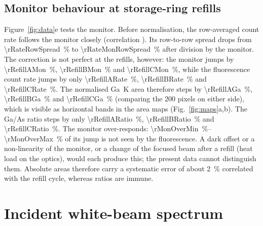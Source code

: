 \documentclass[11pt,a4paper]{article}
\begin{document}
\subsection{Monitor behaviour at storage-ring refills}\label{sec:refills}
Figure~\ref{fig:data}e tests the monitor. Before normalisation, the row-averaged count rate follows the
monitor closely (correlation \rRateMonCorr). Its row-to-row spread drops from \qty{\rRateRowSpread}{\percent}
to \qty{\rRateMonRowSpread}{\percent} after division by the monitor. The correction is not perfect at
the refills, however: the monitor jumps by \qty{\rRefillAMon}{\percent}, \qty{\rRefillBMon}{\percent} and
\qty{\rRefillCMon}{\percent}, while the fluorescence count rate jumps by only
\qty{\rRefillARate}{\percent}, \qty{\rRefillBRate}{\percent} and \qty{\rRefillCRate}{\percent}.
The normalised Ga~K area therefore steps by \qty{\rRefillAGa}{\percent}, \qty{\rRefillBGa}{\percent} and
\qty{\rRefillCGa}{\percent} (comparing the 200 pixels on either side), which is visible as
horizontal bands in the area maps (Fig.~\ref{fig:maps}a,b). The Ga/As ratio steps by only
\qty{\rRefillARatio}{\percent}, \qty{\rRefillBRatio}{\percent} and \qty{\rRefillCRatio}{\percent}.
The monitor over-responds: \qtyrange{\rMonOverMin}{\rMonOverMax}{\percent} of its jump is not seen by the fluorescence. A dark
offset or a non-linearity of the monitor, or a change of the focused beam after a refill (heat load on
the optics), would each produce this; the present data cannot distinguish them. Absolute
areas therefore carry a systematic error of about \qty{2}{\percent} correlated with the refill cycle,
whereas ratios are immune.

\section{Incident white-beam spectrum}\label{sec:beam}
\end{document}
